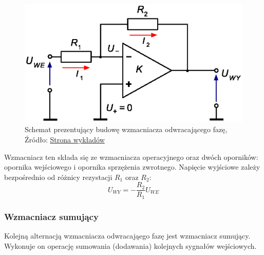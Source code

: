 \documentclass{article}
\begin{document}
      \begin{figure}[!ht]
        \centering
        \includegraphics[scale=0.70]{grafiki/odwracajacy_faze.eps}
        \caption{Schemat prezentujący budowę wzmacniacza odwracającego fazę,
        \\Źródło: \href{https://spe.if.uj.edu.pl/literatura}{Strona wykładów}}
        \label{fig1:schemat_odwracajacego}
      \end{figure}

      Wzmacniacz ten składa się ze wzmacniacza operacyjnego oraz dwóch oporników: opornika wejściowego i opornika sprzężenia zwrotnego.
      Napięcie wyjściowe zależy bezpośrednio od różnicy rezystacji $R_1$ oraz $R_2$:
      \begin{equation}
        U_{WY} = - \frac{R_2}{R_1}U_{WE}
        \label{eq1:odwracajacy}
      \end{equation}

      \subsubsection{Wzmacniacz sumujący}
        Kolejną alternacją wzmacniacza odwracająego fazę jest wzmacniacz sumujący. Wykonuje on operację sumowania (dodawania) kolejnych sygnałów wejściowych.
\end{document}
